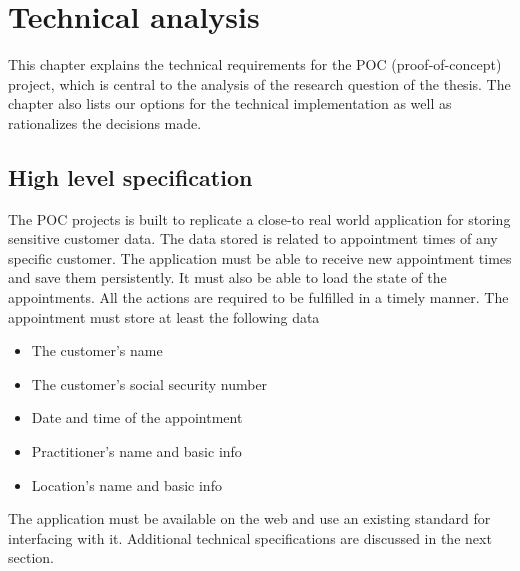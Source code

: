 \chapter{Technical analysis} \label{technical analysis}

This chapter explains the technical requirements for the POC (proof-of-concept) project, which is central to the analysis of the research question of the thesis.
The chapter also lists our options for the technical implementation as well as rationalizes the decisions made.

\section{High level specification}


The POC projects is built to replicate a close-to real world application for storing sensitive customer data.
The data stored is related to appointment times of any specific customer.
The application must be able to receive new appointment times and save them persistently.
It must also be able to load the state of the appointments.
All the actions are required to be fulfilled in a timely manner.
The appointment must store at least the following data
\begin{itemize}
    \item The customer's name
    \item The customer's social security number
    \item Date and time of the appointment
    \item Practitioner's name and basic info
    \item Location's name and basic info
\end{itemize}

The application must be available on the web and use an existing standard for interfacing with it.
Additional technical specifications are discussed in the next section.

